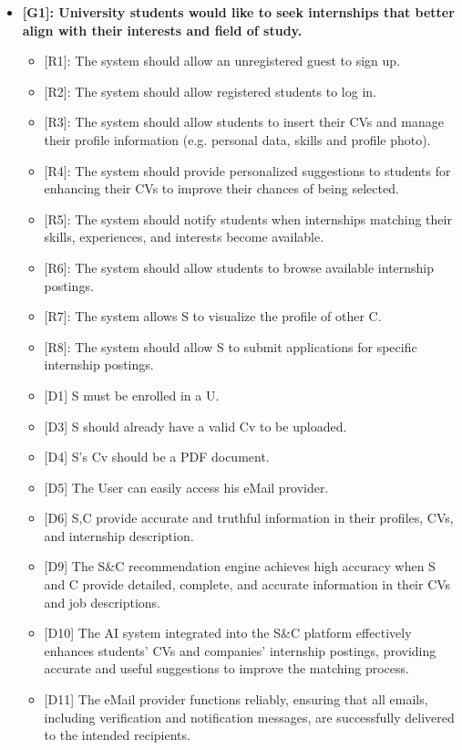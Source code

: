 \begin{itemize}
\item
  \textbf{{[}G1{]}: University students would like to seek internships
  that better align with their interests and field of study.}

  \begin{itemize}
  \item
    {[}R1{]}: The system should allow an unregistered guest to sign up.
  \item
    {[}R2{]}: The system should allow registered students to log in.
  \item
    {[}R3{]}: The system should allow students to insert their CVs and
    manage their profile information (e.g. personal data, skills and
    profile photo).
  \item
    {[}R4{]}: The system should provide personalized suggestions to
    students for enhancing their CVs to improve their chances of being
    selected.
  \item
    {[}R5{]}: The system should notify students when internships
    matching their skills, experiences, and interests become available.
  \item
    {[}R6{]}: The system should allow students to browse available
    internship postings.
  \item
    {[}R7{]}: The system allows S to visualize the profile of other C.~
  \item
    {[}R8{]}: The system should allow S to submit applications for
    specific internship postings.
  \item
    {[}D1{]} S must be enrolled in a U.
  \item
    {[}D3{]} S should already have a valid Cv to be uploaded.
  \item
    {[}D4{]} S's Cv should be a PDF document.
  \item
    {[}D5{]} The User can easily access his eMail provider.
  \item
    {[}D6{]} S,C provide accurate and truthful information in their
    profiles, CVs, and internship description.
  \item
    {[}D9{]} The S\&C recommendation engine achieves high accuracy when
    S and C provide detailed, complete, and accurate information in
    their CVs and job descriptions.
  \item
    {[}D10{]} The AI system integrated into the S\&C platform
    effectively enhances students' CVs and
    companies' internship postings, providing accurate
    and useful suggestions to improve the matching process.
  \item
    {[}D11{]} The eMail provider functions reliably, ensuring that all
    emails, including verification and notification messages, are
    successfully delivered to the intended recipients.
  \end{itemize}
\end{itemize}

